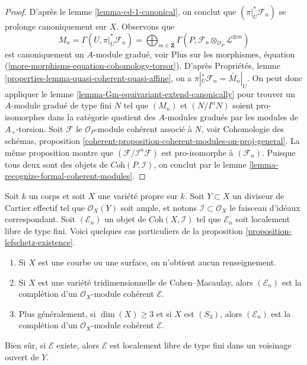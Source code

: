 \begin{proof}
\medskip\noindent
D'après le lemme \ref{lemma-cd-1-canonical}, on conclut que
$(\pi|_U^*\mathcal{F}_n)$ se prolonge canoniquement sur $X$.
Observons que
$$
M_n = \Gamma(U, \pi|_U^*\mathcal{F}_n) =
\bigoplus\nolimits_{m \in \mathbf{Z}}
\Gamma(P, \mathcal{F}_n \otimes_{\mathcal{O}_P} \mathcal{L}^{\otimes m})
$$
est canoniquement un $A$-module gradué, voir
Plus sur les morphismes, équation (\ref{more-morphisms-equation-cohomology-torsor}).
D'après Propriétés, lemme \ref{properties-lemma-quasi-coherent-quasi-affine},
on a $\pi|_U^*\mathcal{F}_n = \widetilde{M_n}|_U$.
On peut donc appliquer le lemme \ref{lemma-Gm-equivariant-extend-canonically}
pour trouver un $A$-module gradué de type fini $N$ tel que
$(M_n)$ et $(N/I^nN)$ soient pro-isomorphes dans la catégorie quotient
des $A$-modules gradués par les modules de $A_+$-torsion.
Soit $\mathcal{F}$ le $\mathcal{O}_P$-module cohérent
associé à $N$, voir
Cohomologie des schémas, proposition
\ref{coherent-proposition-coherent-modules-on-proj-general}.
La même proposition montre que $(\mathcal{F}/\mathcal{I}^n\mathcal{F})$
est pro-isomorphe à $(\mathcal{F}_n)$.
Puisque tous deux sont des objets de $\textit{Coh}(P, \mathcal{I})$,
on conclut par le lemme \ref{lemma-recognize-formal-coherent-modules}.
\end{proof}

\begin{example}
\label{example-lefschetz-existence}
Soit $k$ un corps et soit $X$ une variété propre sur $k$.
Soit $Y \subset X$ un diviseur de Cartier effectif tel que
$\mathcal{O}_X(Y)$ soit ample, et notons
$\mathcal{I} \subset \mathcal{O}_X$ le faisceau d'idéaux
correspondant. Soit $(\mathcal{E}_n)$ un objet
de $\textit{Coh}(X, \mathcal{I})$ tel que $\mathcal{E}_n$ soit
localement libre de type fini.
Voici quelques cas particuliers de la
proposition \ref{proposition-lefschetz-existence}.
\begin{enumerate}
\item Si $X$ est une courbe ou une surface, on n'obtient aucun renseignement.
\item Si $X$ est une variété tridimensionnelle de Cohen--Macaulay, alors
$(\mathcal{E}_n)$ est la complétion d'un
$\mathcal{O}_X$-module cohérent $\mathcal{E}$.
\item Plus généralement, si $\dim(X) \geq 3$ et si $X$ est $(S_3)$, alors
$(\mathcal{E}_n)$ est la complétion d'un
$\mathcal{O}_X$-module cohérent $\mathcal{E}$.
\end{enumerate}
Bien sûr, si $\mathcal{E}$ existe, alors $\mathcal{E}$ est localement libre
de type fini dans un voisinage ouvert de $Y$.
\end{example}

